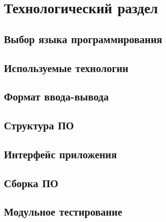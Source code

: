 
\chapter{Технологический раздел}

\section{Выбор языка программирования}

\section{Используемые технологии}

\section{Формат ввода-вывода}

\section{Структура ПО}

\section{Интерфейс приложения}

\section{Сборка ПО}

\section{Модульное тестирование}
